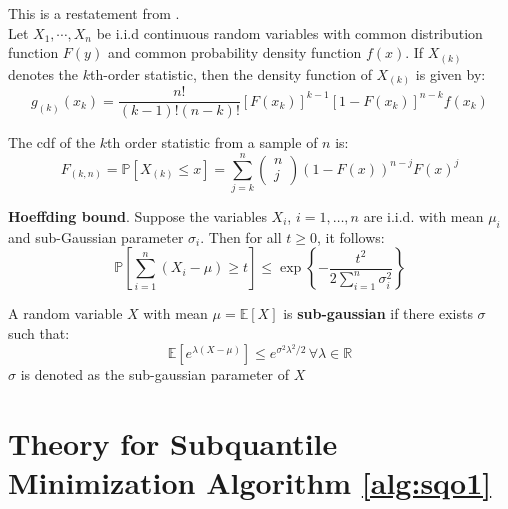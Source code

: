 \documentclass{article} %
\begin{document}
\begin{appendices}
	\begin{fact}
		This is a restatement from \cite{Wackerly2008}.\\
		Let $X_1,\cdots, X_n$ be i.i.d continuous random variables with common distribution function $F(y)$ and common probability density function $f(x)$. If $X_{(k)}$ denotes the $k$th-order statistic, then the density function of $X_{(k)}$ is given by:
		\begin{equation}
			g_{(k)}(x_k) = \frac{n!}{(k-1)!(n-k)!}[F(x_k)]^{k-1}[1 - F(x_k)]^{n-k}f(x_k)
		\end{equation}
	\end{fact}

	\begin{fact}
		The cdf of the $k$th order statistic from a sample of $n$ is:
		\begin{equation}
			F_{(k,n)} = \mathbb{P}\left[X_{(k)}\leq x \right] = \sum_{j=k}^n \begin{pmatrix} n \\ j\end{pmatrix} \left(1 - F(x)\right)^{n-j} F(x)^j
		\end{equation}
	\end{fact}

	\begin{fact}
		\textbf{Hoeffding bound}. Suppose the variables $X_i$, $i = 1,\dots,n$ are i.i.d. with mean $\mu_i$ and sub-Gaussian parameter $\sigma_i$. Then for all $t \geq 0$, it follows:
		\begin{equation}
			\mathbb{P}\left[\sum_{i=1}^n\left(X_i - \mu\right) \geq t\right] \leq \exp \left\{-\frac{t^2}{2\sum_{i=1}^n\sigma_i^2}\right\}
		\end{equation}
	\end{fact}
	
	\begin{fact}
		A random variable $X$ with mean $\mu = \mathbb{E}\left[X\right]$ is \textbf{sub-gaussian} if there exists $\sigma$ such that:
		\begin{equation}
			\mathbb{E}\left[e^{\lambda(X - \mu)}\right] \leq e^{\sigma^2\lambda^2/2} \, \forall \lambda \in \mathbb{R}
		\end{equation}
		$\sigma$ is denoted as the sub-gaussian parameter of $X$
	\end{fact}

	\newpage
	\section{Theory for Subquantile Minimization Algorithm \ref{alg:sqo1}}\label{app:general-proofs}

\end{appendices}
\end{document}
